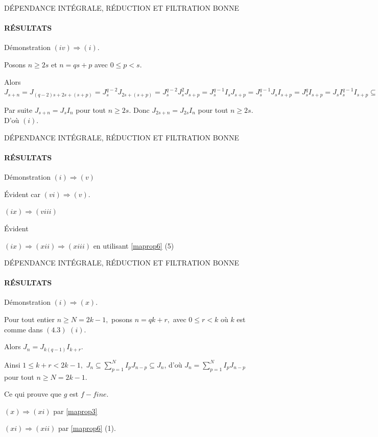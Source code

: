 \documentclass[11pt,a4paper]{beamer}
\begin{document}
\begin{frame}{DÉPENDANCE INTÉGRALE, RÉDUCTION ET FILTRATION BONNE}
	\framesubtitle{RÉSULTATS}
	\begin{block}{Démonstration}
		$(iv)\Longrightarrow (i).$
		
		Posons $n\geq 2s$ et $n=qs+p$ avec $0\leq p<s.$
		
		Alors $J_{s+n}=J_{(q-2)s+2s+(s+p)}=J_{s}^{q-2}J_{2s+(s+p)}=J_{s}^{q-2}J_{s}^{2}J_{s+p}=J_{s}^{q-1}I_{s}J_{s+p}=J_{s}^{q-1}J_{s}I_{s+p}=J_{s}^{q}I_{s+p}=J_{s}I_{s}^{q-1}I_{s+p}\subseteq J_{s}I_{n}\subseteq J_{s+n}.
		$
		
		Par suite $J_{s+n}=J_{s}I_{n}$ pour tout $n\geq 2s.$ Donc $%
		J_{2s+n}=J_{2s}I_{n}$ pour tout $n\geq 2s.$ D'où $(i).$
		
		
		
	\end{block}
\end{frame}

\begin{frame}{DÉPENDANCE INTÉGRALE, RÉDUCTION ET FILTRATION BONNE}
	\framesubtitle{RÉSULTATS}
	\begin{block}{Démonstration}
		$(i)\Longrightarrow (v)$
		
		Évident car $(vi)\Longrightarrow (v).$
		
		$(ix)\Longrightarrow (viii)$
		
		Évident
		
		$(ix)\Longrightarrow (xii)\Longrightarrow (xiii)$ en utilisant \ref{maprop6} (5)
		
	\end{block}
\end{frame}

\begin{frame}{DÉPENDANCE INTÉGRALE, RÉDUCTION ET FILTRATION BONNE}
	\framesubtitle{RÉSULTATS}
	\begin{block}{Démonstration}
				$(i)\Longrightarrow (x).$
		
		Pour tout entier $n\geq N=2k-1,$ posons $n=qk+r,$ avec $0\leq r<k$ où $k$
		est comme dans $(4.3)$ $(i).$
		
		Alors $J_{n}=J_{k(q-1)}I_{k+r}.$
		
		Ainsi $1\leq k+r<2k-1,$ $J_{n}\subseteq
		\sum\limits_{p=1}^{N}I_{p}J_{n-p}\subseteq J_{n}$, d'où $J_{n}=\sum\limits_{p=1}^{N}I_{p}J_{n-p}$ pour tout $n\geq N=2k-1$.
		
		Ce qui prouve que $g$ est $f-fine.$
		
		$(x)\Longrightarrow (xi)$ par \ref{maprop3}
		
		$(xi)\Longrightarrow (xii)$ par \ref{maprop6} (1).
	\end{block}
\end{frame}
\end{document}
